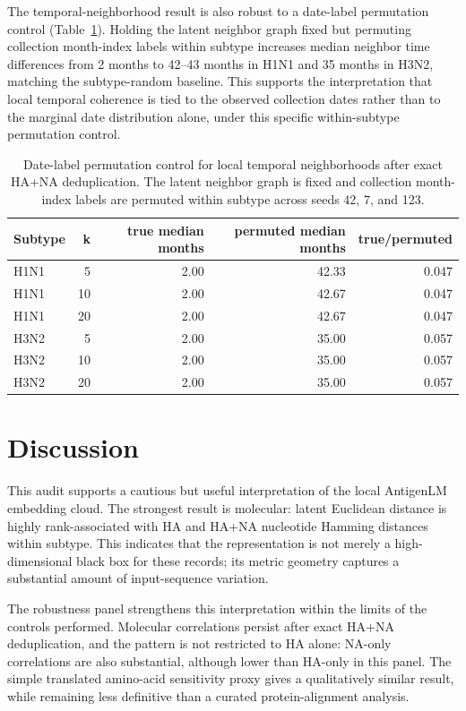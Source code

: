 \documentclass[11pt]{article}
\begin{document}
The temporal-neighborhood result is also robust to a date-label permutation control (Table~\ref{tab:temporal-permutation}). Holding the latent neighbor graph fixed but permuting collection month-index labels within subtype increases median neighbor time differences from 2 months to 42--43 months in H1N1 and 35 months in H3N2, matching the subtype-random baseline. This supports the interpretation that local temporal coherence is tied to the observed collection dates rather than to the marginal date distribution alone, under this specific within-subtype permutation control.

\begin{table}[H]
\centering
\caption{Date-label permutation control for local temporal neighborhoods after exact HA+NA deduplication. The latent neighbor graph is fixed and collection month-index labels are permuted within subtype across seeds 42, 7, and 123.}
\label{tab:temporal-permutation}
\begin{tabular}{lrrrr}
\toprule
Subtype & k & true median months & permuted median months & true/permuted \\
\midrule
H1N1 & 5 & 2.00 & 42.33 & 0.047 \\
H1N1 & 10 & 2.00 & 42.67 & 0.047 \\
H1N1 & 20 & 2.00 & 42.67 & 0.047 \\
H3N2 & 5 & 2.00 & 35.00 & 0.057 \\
H3N2 & 10 & 2.00 & 35.00 & 0.057 \\
H3N2 & 20 & 2.00 & 35.00 & 0.057 \\
\bottomrule
\end{tabular}
\end{table}

\section{Discussion}

This audit supports a cautious but useful interpretation of the local AntigenLM embedding cloud. The strongest result is molecular: latent Euclidean distance is highly rank-associated with HA and HA+NA nucleotide Hamming distances within subtype. This indicates that the representation is not merely a high-dimensional black box for these records; its metric geometry captures a substantial amount of input-sequence variation.

The robustness panel strengthens this interpretation within the limits of the controls performed. Molecular correlations persist after exact HA+NA deduplication, and the pattern is not restricted to HA alone: NA-only correlations are also substantial, although lower than HA-only in this panel. The simple translated amino-acid sensitivity proxy gives a qualitatively similar result, while remaining less definitive than a curated protein-alignment analysis.
\end{document}
